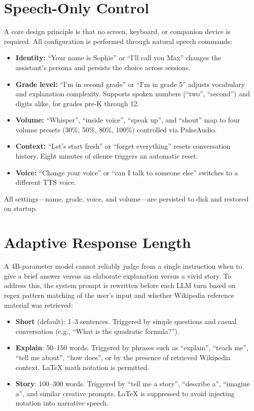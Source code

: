 \documentclass[11pt]{article}
\begin{document}
\section{Speech-Only Control}

A core design principle is that no screen, keyboard, or companion device is required.
All configuration is performed through natural speech commands:

\begin{itemize}[nosep]
  \item \textbf{Identity:}
    ``Your name is Sophie'' or ``I'll call you Max'' changes the assistant's persona and persists the choice across sessions.
  \item \textbf{Grade level:}
    ``I'm in second grade'' or ``I'm in grade 5'' adjusts vocabulary and explanation complexity.
    Supports spoken numbers (``two'', ``second'') and digits alike, for grades pre-K through 12.
  \item \textbf{Volume:}
    ``Whisper'', ``inside voice'', ``speak up'', and ``shout'' map to four volume presets (30\%, 50\%, 80\%, 100\%) controlled via PulseAudio.
  \item \textbf{Context:}
    ``Let's start fresh'' or ``forget everything'' resets conversation history.
    Eight minutes of silence triggers an automatic reset.
  \item \textbf{Voice:}
    ``Change your voice'' or ``can I talk to someone else'' switches to a different TTS voice.
\end{itemize}

\noindent All settings---name, grade, voice, and volume---are persisted to disk and restored on startup.

\section{Adaptive Response Length}

A 4B-parameter model cannot reliably judge from a single instruction when to give a brief answer versus an elaborate explanation versus a vivid story.
To address this, the system prompt is rewritten before each LLM turn based on regex pattern matching of the user's input and whether Wikipedia reference material was retrieved:

\begin{itemize}[nosep]
  \item \textbf{Short} (default): 1--3 sentences.
    Triggered by simple questions and casual conversation (e.g., ``What is the quadratic formula?'').
  \item \textbf{Explain}: 50--150 words.
    Triggered by phrases such as ``explain'', ``teach me'', ``tell me about'', ``how does'',
    or by the presence of retrieved Wikipedia context.
    LaTeX math notation is permitted.
  \item \textbf{Story}: 100--300 words.
    Triggered by ``tell me a story'', ``describe a'', ``imagine a'', and similar creative prompts.
    LaTeX is suppressed to avoid injecting notation into narrative speech.
\end{itemize}
\end{document}
